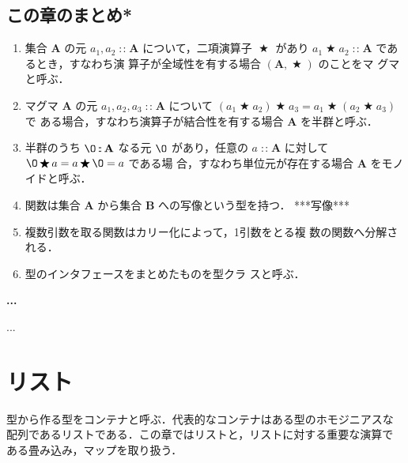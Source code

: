 \documentclass[a5paper,twoside,fleqn]{jsbook}
\newcommand{\programminglanguage}[1]{\textsf{#1}}
\newcommand{\haskell}{\programminglanguage{Haskell}}
\newenvironment{leader}{\begingroup\gt}{\endgroup}
\newenvironment{note}[1]{\begin{boxnote}\begin{center}\textbf{#1}\end{center}}{\end{boxnote}}
\newcommand{\code}[1]{\texttt{#1}}
\newcommand{\mZero}{\O}
\DeclareMathOperator{\mBinOp}{\bigstar}
\DeclareMathOperator{\mIn}{{:\!:}}
\DeclareMathOperator{\mPlus}{\maltese}
\newcommand{\mSet}[1]{\mathbf{#1}}
\newcommand{\mType}[1]{\mathbf{#1}}
\newcommand{\mTupleWith}[1]{\left(#1\right)}
\newcommand{\mGenericTypeClass}[1]{\textsc{#1}} %
\newcommand{\mMonoidTypeClass}{\mGenericTypeClass{Monoid}}
\begin{document}

\section{この章のまとめ*}

\begin{enumerate}
\item 集合 $\mSet{A}$ の元 $a_1,a_2\mIn\mSet{A}$ について，二項演算子
  $\mBinOp$ があり $a_1\mBinOp a_2\mIn\mSet{A}$ であるとき，すなわち演
  算子が全域性を有する場合 $\mTupleWith{\mSet{A},\mBinOp}$ のことをマ
  グマと呼ぶ．\item マグマ $\mSet{A}$ の元 $a_1,a_2,a_3\mIn\mSet{A}$
  について $(a_1\mBinOp a_2)\mBinOp a_3=a_1\mBinOp(a_2\mBinOp a_3)$ で
  ある場合，すなわち演算子が結合性を有する場合 $\mSet{A}$ を半群と呼ぶ．
\item 半群のうち $\mZero\mIn\mSet{A}$ なる元 $\mZero$ があり，任意の
  $a\mIn\mSet{A}$ に対して $\mZero\mBinOp a=a\mBinOp\mZero=a$ である場
  合，すなわち単位元が存在する場合 $\mSet{A}$ をモノイドと呼ぶ．\item
  関数は集合 $\mSet{A}$ から集合 $\mSet{B}$ への写像という型を持つ． %
  ***写像*** \item 複数引数を取る関数はカリー化によって，1引数をとる複
  数の関数へ分解される．\item 型のインタフェースをまとめたものを型クラ
  スと呼ぶ． %
\end{enumerate}


\begin{note}{...}
...
\end{note}

\chapter{リスト}
\label{ch:list}

\begin{leader}
型から作る型をコンテナと呼ぶ．代表的なコンテナはある型のホモジニアスな
配列であるリストである．この章ではリストと，リストに対する重要な演算で
ある畳み込み，マップを取り扱う．
\end{leader}
\end{document}
